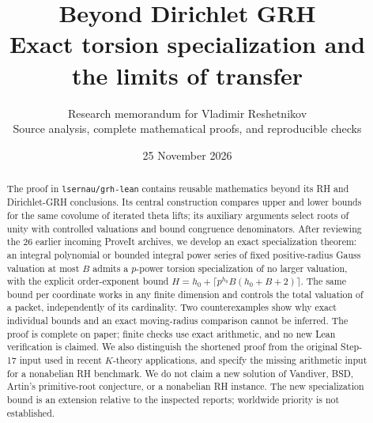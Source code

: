 \documentclass[11pt]{article}
\title{\color{ink}\bfseries Beyond Dirichlet GRH\\[5pt]
\Large Exact torsion specialization and the limits of transfer}
\author{Research memorandum for Vladimir Reshetnikov\\
\small Source analysis, complete mathematical proofs, and reproducible checks}
\date{25 November 2026}
\theoremstyle{definition}\newtheorem{definition}[theorem]{Definition}
\begin{document}
\maketitle
\begin{abstract}
The proof in \texttt{lsernau/grh-lean} contains reusable mathematics beyond its
RH and Dirichlet-GRH conclusions. Its central construction compares upper and
lower bounds for the same covolume of iterated theta lifts; its auxiliary
arguments select roots of unity with controlled valuations and bound
congruence denominators. After reviewing the 26 earlier incoming ProveIt
archives, we develop an exact specialization theorem: an integral polynomial
or bounded integral power series of fixed positive-radius Gauss valuation at
most \(B\) admits a \(p\)-power torsion specialization of no larger valuation,
with the explicit order-exponent bound
\(H=h_0+\lceil p^{h_0}B(h_0+B+2)\rceil\).
The same bound per coordinate works in any finite dimension and controls the
total valuation of a packet, independently of its cardinality. Two
counterexamples show why exact individual bounds and an exact moving-radius
comparison cannot be inferred. The proof is complete on paper; finite checks
use exact arithmetic, and no new Lean verification is claimed.
We also distinguish the shortened proof from the original Step-17 input used
in recent \(K\)-theory applications, and specify the missing arithmetic input
for a nonabelian RH benchmark. We do not claim a new solution of Vandiver,
BSD, Artin's primitive-root conjecture, or a nonabelian RH instance. The new
specialization bound is an extension relative to the inspected reports;
worldwide priority is not established.
\end{abstract}
\clearpage
\tableofcontents
\newpage






\appendix


\end{document}
